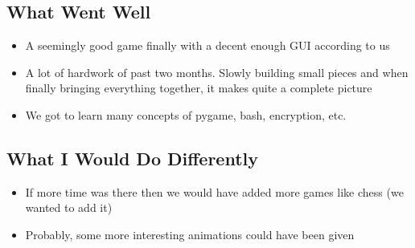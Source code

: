 \documentclass[12pt, a4paper]{article}
\begin{document}
\subsection{What Went Well}
\begin{itemize}
    \item A seemingly good game finally with a decent enough GUI according to us
    \item A lot of hardwork of past two months. Slowly building small pieces and when finally bringing everything together, it makes quite a complete picture
    \item We got to learn many concepts of pygame, bash, encryption, etc.
\end{itemize}

\subsection{What I Would Do Differently}
\begin{itemize}
    \item If more time was there then we would have added more games like chess (we wanted to add it)
    \item Probably, some more interesting animations could have been given
\end{itemize}


\nocite{*}

\end{document}
